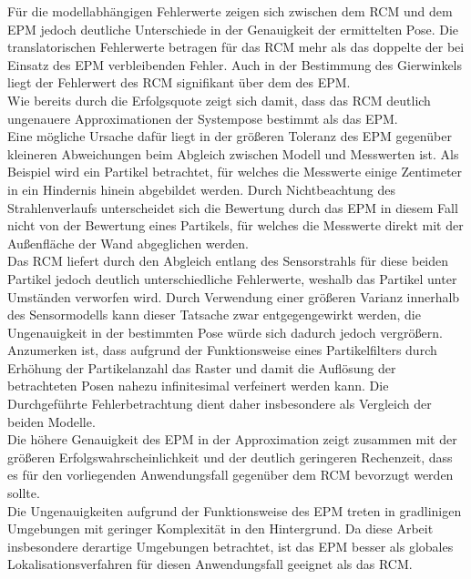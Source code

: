 Für die modellabhängigen Fehlerwerte zeigen sich zwischen dem RCM und dem EPM jedoch deutliche Unterschiede in der Genauigkeit der ermittelten Pose. Die translatorischen Fehlerwerte betragen für das RCM mehr als das doppelte der bei Einsatz des EPM verbleibenden Fehler. Auch in der Bestimmung des Gierwinkels liegt der Fehlerwert des RCM signifikant über dem des EPM.\\
Wie bereits durch die Erfolgsquote zeigt sich damit, dass das RCM deutlich ungenauere Approximationen der Systempose bestimmt als das EPM.\\

Eine mögliche Ursache dafür liegt in der größeren Toleranz des EPM gegenüber kleineren Abweichungen beim Abgleich zwischen Modell und Messwerten ist. Als Beispiel wird ein Partikel betrachtet, für welches die Messwerte einige Zentimeter in ein Hindernis hinein abgebildet werden. Durch Nichtbeachtung des Strahlenverlaufs unterscheidet sich die Bewertung durch das EPM in diesem Fall nicht von der Bewertung eines Partikels, für welches die Messwerte direkt mit der Außenfläche der Wand abgeglichen werden.\\
Das RCM liefert durch den Abgleich entlang des Sensorstrahls für diese beiden Partikel jedoch deutlich unterschiedliche Fehlerwerte, weshalb das Partikel unter Umständen verworfen wird. Durch Verwendung einer größeren Varianz innerhalb des Sensormodells kann dieser Tatsache zwar entgegengewirkt werden, die Ungenauigkeit in der bestimmten Pose würde sich dadurch jedoch vergrößern.\\

Anzumerken ist, dass aufgrund der Funktionsweise eines Partikelfilters durch Erhöhung der Partikelanzahl das Raster und damit die Auflösung der betrachteten Posen nahezu infinitesimal verfeinert werden kann. Die Durchgeführte Fehlerbetrachtung dient daher insbesondere als Vergleich der beiden Modelle.\\
Die höhere Genauigkeit des EPM in der Approximation zeigt zusammen mit der größeren Erfolgswahrscheinlichkeit und der deutlich geringeren Rechenzeit, dass es für den vorliegenden Anwendungsfall gegenüber dem RCM bevorzugt werden sollte.\\
Die Ungenauigkeiten aufgrund der Funktionsweise des EPM treten in gradlinigen Umgebungen mit geringer Komplexität in den Hintergrund. Da diese Arbeit insbesondere derartige Umgebungen betrachtet, ist das EPM besser als globales Lokalisationsverfahren für diesen Anwendungsfall geeignet als das RCM.

